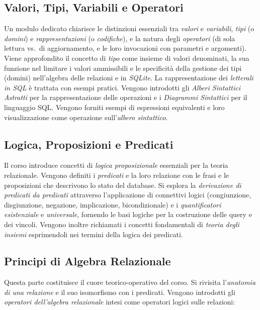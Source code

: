 \documentclass[withtimes]{easychair}
\begin{document}
\subsection{Valori, Tipi, Variabili e Operatori}\label{valori-tipi-variabili-e-operatori}

Un modulo dedicato chiarisce le distinzioni essenziali tra \emph{valori} e \emph{variabili}, \emph{tipi} (o \emph{domini}) e \emph{rappresentazioni}
(o \emph{codifiche}), e la natura degli \emph{operatori} (di sola lettura vs.~di aggiornamento, e le loro invocazioni con parametri e argomenti). Viene approfondito il concetto di \emph{tipo} come insieme di valori denominati, la sua funzione nel limitare i valori ammissibili e le specificità della gestione dei tipi (domini) nell'algebra delle relazioni e in \emph{SQLite}. La rappresentazione dei \emph{letterali in SQL} è trattata con esempi pratici. Vengono introdotti gli \emph{Alberi Sintattici Astratti} per la rappresentazione delle operazioni e i \emph{Diagrammi Sintattici} per il linguaggio SQL. Vengono forniti esempi di espressioni equivalenti e loro visualizzazione come operazione sull'\emph{albero sintattico}.

\subsection{Logica, Proposizioni e Predicati}\label{logica-proposizioni-e-predicati}

Il corso introduce concetti di \emph{logica proposizionale} essenziali per la teoria relazionale. Vengono definiti i \emph{predicati} e la loro relazione con le frasi e le proposizioni che descrivono lo stato del database. Si esplora la \emph{derivazione di predicati da predicati} attraverso l'applicazione di connettivi logici (congiunzione, disgiunzione, negazione, implicazione, bicondizionale) e i \emph{quantificatori} \emph{esistenziale} e \emph{universale}, fornendo le basi logiche per la costruzione delle query e dei vincoli. Vengono inoltre richiamati i concetti fondamentali di \emph{teoria degli insiemi} esprimendoli nei termini della logica dei predicati.

\subsection{Principi di Algebra Relazionale}\label{principi-di-algebra-relazionale}

Questa parte costituisce il cuore teorico-operativo del corso. Si rivisita l'\emph{anatomia di una relazione} e il suo isomorfismo con i predicati. Vengono introdotti gli \emph{operatori dell'algebra relazionale} intesi come operatori logici sulle relazioni:
\end{document}
